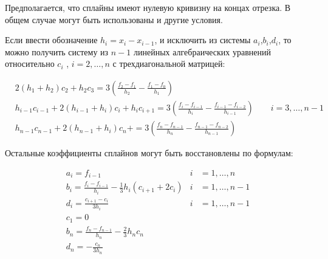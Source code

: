 Предполагается, что сплайны имеют нулевую кривизну на концах отрезка. В общем
случае могут быть использованы и другие условия.

Если ввести обозначение $h_i = x_i - x_{i-1}$, и исключить из системы
$a_i$,$b_i$,$d_i$, то можно получить систему из $n - 1$ линейных
алгебраических уравнений относительно
$c_i$ , $i = 2,\hdots, n$ с трехдиагональной матрицей:

$$\begin{aligned}
& 2(h_1 + h_2)c_2 + h_2c_3 =
    3\left(\frac{f_2 - f_1}{h_2} - \frac{f_1-f_0}{h_1}\right) \\
& h_{i-1}c_{i-1} + 2(h_{i-1} + h_i)c_i + h_ic_{i+1} =
3\left(\frac{f_i - f_{i-1}}{h_i} - \frac{f_{i-1}-f_{i-2}}{h_{i-1}}\right)
\qquad i = 3,\hdots,n-1 \\
& h_{n-1}c_{n-1} + 2(h_{n-1} + h_i)c_n + =
3\left(\frac{f_n - f_{n-1}}{h_n} - \frac{f_{n-1}-f_{n-2}}{h_{n-1}}\right)
\end{aligned}$$

Остальные коэффициенты сплайнов могут быть восстановлены по формулам:

\begin{align*}
& a_i = f_{i-1} & i & = 1,\hdots,n \\
& b_i = \frac{f_{i}-f_{i-1}}{h_{i}} - \frac{1}{3}h_i(c_{i+1}+2c_i)
    & i & = 1,\hdots,n-1 & \\
& d_i = \frac{c_{i+1}-c_i}{3h_i} & i & = 1,\hdots,n-1 \\
& c_1 = 0 \\
& b_n = \frac{f_n - f_{n-1}}{h_n} - \frac{2}{3}h_nc_n \\
& d_n = - \frac{c_n}{3h_n}
\end{align*}


\pagebreak